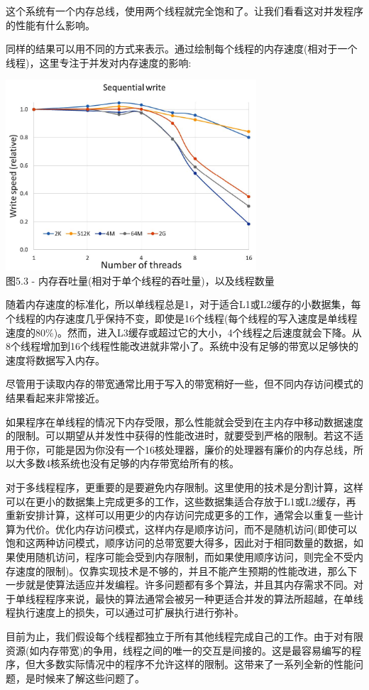 这个系统有一个内存总线，使用两个线程就完全饱和了。让我们看看这对并发程序的性能有什么影响。


同样的结果可以用不同的方式来表示。通过绘制每个线程的内存速度(相对于一个线程)，这里专注于并发对内存速度的影响:

\begin{center}
\includegraphics[width=0.7\textwidth]{content/1/chapter5/images/3.jpg}\\
图5.3 - 内存吞吐量(相对于单个线程的吞吐量)，以及线程数量
\end{center}

随着内存速度的标准化，所以单线程总是1，对于适合L1或L2缓存的小数据集，每个线程的内存速度几乎保持不变，即使是16个线程(每个线程的写入速度是单线程速度的80\%)。然而，进入L3缓存或超过它的大小，4个线程之后速度就会下降。从8个线程增加到16个线程性能改进就非常小了。系统中没有足够的带宽以足够快的速度将数据写入内存。

尽管用于读取内存的带宽通常比用于写入的带宽稍好一些，但不同内存访问模式的结果看起来非常接近。

如果程序在单线程的情况下内存受限，那么性能就会受到在主内存中移动数据速度的限制。可以期望从并发性中获得的性能改进时，就要受到严格的限制。若这不适用于你，可能是因为你没有一个16核处理器，廉价的处理器有廉价的内存总线，所以大多数4核系统也没有足够的内存带宽给所有的核。

对于多线程程序，更重要的是要避免内存限制。这里使用的技术是分割计算，这样可以在更小的数据集上完成更多的工作，这些数据集适合存放于L1或L2缓存，再重新安排计算，这样可以用更少的内存访问完成更多的工作，通常会以重复一些计算为代价。优化内存访问模式，这样内存是顺序访问，而不是随机访问(即使可以饱和这两种访问模式，顺序访问的总带宽要大得多，因此对于相同数量的数据，如果使用随机访问，程序可能会受到内存限制，而如果使用顺序访问，则完全不受内存速度的限制)。仅靠实现技术是不够的，并且不能产生预期的性能改进，那么下一步就是使算法适应并发编程。许多问题都有多个算法，并且其内存需求不同。对于单线程程序来说，最快的算法通常会被另一种更适合并发的算法所超越，在单线程执行速度上的损失，可以通过可扩展执行进行弥补。

目前为止，我们假设每个线程都独立于所有其他线程完成自己的工作。由于对有限资源(如内存带宽)的争用，线程之间的唯一的交互是间接的。这是最容易编写的程序，但大多数实际情况中的程序不允许这样的限制。这带来了一系列全新的性能问题，是时候来了解这些问题了。


















